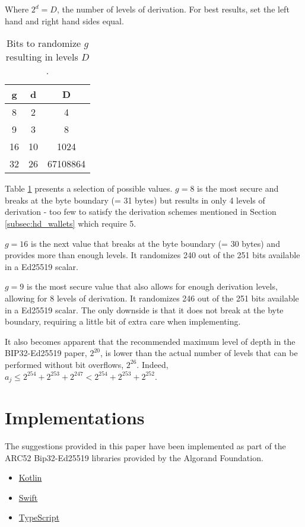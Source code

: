 \documentclass[12pt, a4paper, twocolumn]{article}
\begin{document}
Where $2^d = D$, the number of levels of derivation. For best results, set the left hand and right hand sides equal.

\begin{table}[h]
  \centering
  \begin{tabular}{|c|c|c|}
  \hline
  g & d  & D  \\
  \hline
  8 & 2 & 4 \\
  9 & 3 & 8 \\
  16 & 10 & 1024 \\
  32 & 26 & 67108864 \\
  \hline
  \end{tabular}
  \caption{Bits to randomize $g$ resulting in levels $D$.}
  \label{tab:g_and_d}
  \end{table}


Table \ref{tab:g_and_d} presents a selection of possible values. $g=8$ is the most secure and breaks at the byte boundary (= 31 bytes) but results in only 4 levels of derivation - too few to satisfy the derivation schemes mentioned in Section \ref{subsec:hd_wallets} which require 5.

$g=16$ is the next value that breaks at the byte boundary (= 30 bytes) and provides more than enough levels. It randomizes 240 out of the 251 bits available in a Ed25519 scalar.

$g=9$ is the most secure value that also allows for enough derivation levels, allowing for 8 levels of derivation. It randomizes 246 out of the 251 bits available in a Ed25519 scalar. The only downside is that it does not break at the byte boundary, requiring a little bit of extra care when implementing.

It also becomes apparent that the recommended maximum level of depth in the BIP32-Ed25519 paper, $2^{20}$, is lower than the actual number of levels that can be performed without bit overflows, $2^{26}$. Indeed, $a_{j} \leq 2^{254} + 2^{253} + 2^{247} < 2^{254} + 2^{253} + 2^{252}$.
\section{Implementations}


The suggestions provided in this paper have been implemented as part of the ARC52 Bip32-Ed25519 libraries provided by the Algorand Foundation.

\begin{itemize}
  \item \href{https://github.com/algorandfoundation/bip32-ed25519-kotlin}{Kotlin}
  \item \href{https://github.com/algorandfoundation/bip32-ed25519-swift}{Swift}
  \item \href{https://github.com/algorandfoundation/bip32-ed25519-ts}{TypeScript}
\end{itemize}
\end{document}
